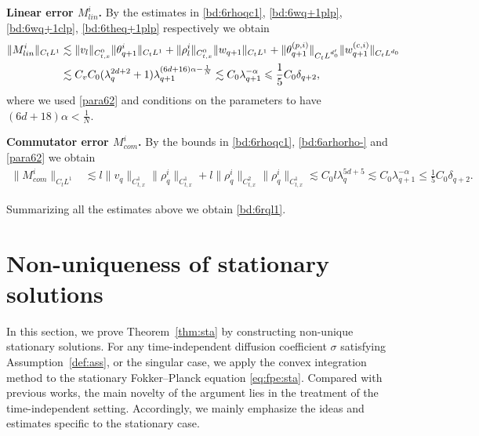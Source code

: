 \documentclass[10pt,a4paper]{amsart}
\numberwithin{equation}{section}
\def\leq{\leqslant}
\def\leq{\leqslant}
\begin{document}
\textbf{Linear error $M^{i}_{lin}$.} 
By the estimates  
in \eqref{bd:6rhoqc1}, \eqref{bd:6wq+1plp}, \eqref{bd:6wq+1clp},  \eqref{bd:6theq+1plp}  respectively we obtain
\begin{align}
 \|M^{i}_{lin}\|_{C_tL^1}&\lesssim \|v_l\|_{C_{t,x}^0}\|\theta_{q+1}^{i}\|_{C_tL^1}+\|\rho^{i}_l \|_{C_{t,x}^0}
\|w_{q+1}\|_{C_tL^1}+   \| \theta_{q+1}^{(p,i)}\|_{C_tL^{d_0'}}\|w_{q+1}^{(c,i)}\|_{C_tL^{d_0}}\notag\\
&\lesssim C_vC_0(\lambda_{q}^{2d+2}+1)\lambda_{q+1}^{(6d+16)\alpha-\frac1{N}}
\lesssim  C_0 \lambda_{q+1}^{-\alpha}\leq  \frac{1}{5}C_0\delta_{q+2},\notag
\end{align}
where we used  \eqref{para62} and   conditions on the parameters to have $(6d+18)\alpha<\frac{1}{N}$. 

\textbf{Commutator error $M_{com}^i$.} By  the bounds in   \eqref{bd:6rhoqc1}, \eqref{bd:6arhorho-} and \eqref{para62}   we obtain
 \begin{align}
  \|M_{ com}^i\|_{C_tL^1}%
 & \lesssim l\|v_q\|_{C_{t,x}^1}\|\rho_q^i\|_{C_{t,x}^1}+l  \| \rho_q^i\|_{C_{t,x}^2}\| \rho_q^i\|_{C_{t,x}^1}\lesssim C_0 l\lambda_q^{5d+5}\lesssim C_0  \lambda_{q+1}^{-\alpha}\leq \frac{1}{5}C_0\delta_{q+2}.\label{bd:6mcom}
   \end{align}   
   
Summarizing all the estimates above  we obtain   \eqref{bd:6rql1}. 

 

\section{Non-uniqueness of stationary solutions}\label{cogpss4}
In this section, we prove Theorem~\ref{thm:sta} by constructing non-unique stationary solutions. 
For any time-independent diffusion coefficient $\sigma$ satisfying Assumption~\ref{def:ass}, or the singular case, we apply the convex integration method to the stationary Fokker--Planck equation \eqref{eq:fpe:sta}. 
Compared with previous works, the main novelty of the argument lies in the treatment of the time-independent setting. Accordingly, we mainly emphasize the ideas and estimates specific to the stationary case. 
\end{document}
